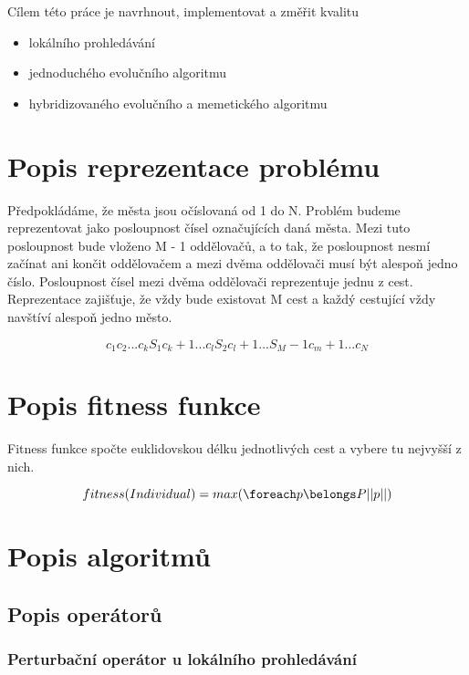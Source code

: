 \documentclass[journal]{IEEEtrancz}
\begin{document}
Cílem této práce je navrhnout, implementovat a změřit kvalitu

\begin{itemize}
\item lokálního prohledávání
\item jednoduchého evolučního algoritmu
\item hybridizovaného evolučního a memetického algoritmu
\end{itemize}

\section{Popis reprezentace problému}

Předpokládáme, že města jsou očíslovaná od 1 do N.
Problém budeme reprezentovat jako posloupnost čísel označujících
daná města. Mezi tuto posloupnost bude vloženo M - 1
oddělovačů, a to tak, že posloupnost nesmí začínat ani končit
oddělovačem a mezi dvěma oddělovači musí být alespoň jedno číslo.
Posloupnost čísel mezi dvěma oddělovači reprezentuje jednu z cest.
Reprezentace zajišťuje, že vždy bude existovat M cest a každý
cestující vždy navštíví alespoň jedno město.

$$
c_1 c_2 ... c_k S_1 c_k+1 ... c_l S_2 c_l+1 ... S_M-1 c_m+1 ... c_N
$$

\section{Popis fitness funkce}

Fitness funkce spočte euklidovskou délku jednotlivých cest a vybere
tu nejvyšší z nich.

$$
fitness(Individual) = max(\foreach p \belongs P ||p||)
$$

\section{Popis algoritmů}



\subsection{Popis operátorů}

\subsubsection{Perturbační operátor u lokálního prohledávání}

\end{document}
